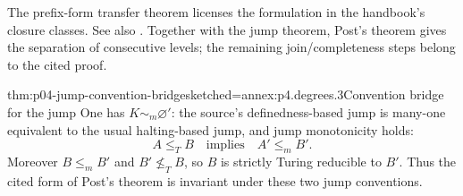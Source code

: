 The prefix-form transfer theorem licenses the formulation in the handbook's
closure classes.  See also \cite{Barwise1977}.  Together with the jump
theorem, Post's theorem gives the separation of consecutive levels; the
remaining join/completeness steps belong to the cited proof.

\begin{hblemma}{thm:p04-jump-convention-bridge}{sketched=annex:p4.degrees.3}{Convention bridge for the jump}
One has \(K\sim_m\varnothing'\): the source's definedness-based jump is
many-one equivalent to the usual halting-based jump, and jump monotonicity
holds:
\[
 A\leq_TB\quad\text{implies}\quad A'\leq_mB'.
\]
Moreover \(B\leq_mB'\) and \(B'\not\leq_TB\), so \(B\) is strictly
Turing reducible to \(B'\).  Thus the cited form of Post's theorem is invariant
under these two jump conventions.
\end{hblemma}

